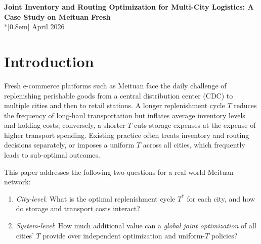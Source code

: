 \documentclass[10pt]{article}
\begin{document}
\begin{center}
    {\Large\bfseries Joint Inventory and Routing Optimization for Multi-City Logistics: A Case Study on Meituan Fresh}\\*[0.8em]
    {\small April 2026}
\end{center}

\begin{abstract}
\noindent\textbf{Abstract---}
The ``last-mile'' fresh-food delivery network faces a fundamental trade-off between inventory holding costs and transportation costs. In this work, we propose a joint optimization framework for a five-city, 25-station logistics network. For each city, we optimize the replenishment cycle $T$ by balancing storage and routing costs; subsequently, we enumerate all $7^5=16{,}807$ global $T$-combinations to identify the system-wide optimum. The best configuration achieves a total daily cost of \textbf{24,874 CNY}, with city-level optimal cycles ranging from $T^*=1$ to $T^*=6$. Compared with uniform-$T$ baselines, the optimal differentiated strategy saves up to \textbf{20,058 CNY/day} (80.6\%). Our results demonstrate that city-specific replenishment policies are essential for cost-efficient operations in heterogeneous logistics networks.
\end{abstract}

\section{Introduction}
Fresh e-commerce platforms such as Meituan face the daily challenge of replenishing perishable goods from a central distribution center (CDC) to multiple cities and then to retail stations. A longer replenishment cycle $T$ reduces the frequency of long-haul transportation but inflates average inventory levels and holding costs; conversely, a shorter $T$ cuts storage expenses at the expense of higher transport spending. Existing practice often treats inventory and routing decisions separately, or imposes a uniform $T$ across all cities, which frequently leads to sub-optimal outcomes.

This paper addresses the following two questions for a real-world Meituan network:
\begin{enumerate}
    \item \textit{City-level}: What is the optimal replenishment cycle $T^*$ for each city, and how do storage and transport costs interact?
    \item \textit{System-level}: How much additional value can a \emph{global joint optimization} of all cities' $T$ provide over independent optimization and uniform-$T$ policies?
\end{enumerate}
\end{document}
